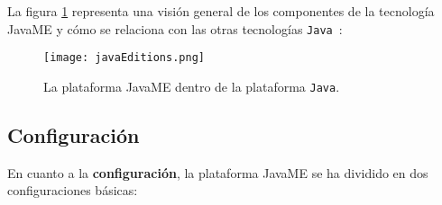 La figura \ref{fig:javaEditions} representa una visión general de los
componentes de la tecnología \acs{JavaME} y cómo se relaciona con las otras
tecnologías \texttt{Java}~\cite{bib:jmeOracle}:

  \begin{figure}[H]
    \begin{center}
      \texttt{[image: javaEditions.png]}
      \caption{La plataforma \acs{JavaME} dentro de la plataforma
      \texttt{Java}.}
      \label{fig:javaEditions}
    \end{center}
  \end{figure}

\subsection{Configuración}
En cuanto a la \textbf{configuración}, la plataforma \acs{JavaME} se ha
dividido en dos configuraciones básicas:
